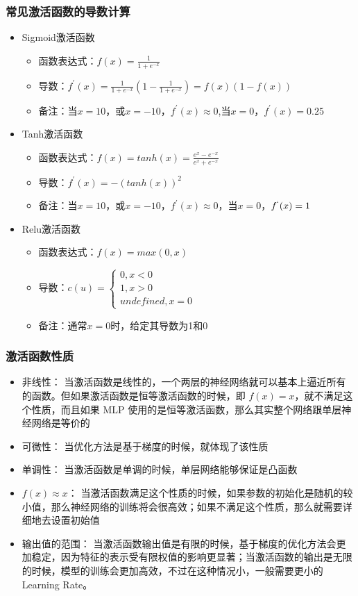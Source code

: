 \documentclass[UTF8]{ctexart}
\begin{document}
\subsubsection{常见激活函数的导数计算}
\begin{itemize}
	\item Sigmoid激活函数 \begin{itemize}
		\item 函数表达式：$f(x)=\frac{1}{1+e^{-x}}$
		\item 导数：$f^{'}(x)=\frac{1}{1+e^{-x}}\left( 1- \frac{1}{1+e^{-x}} \right)=f(x)(1-f(x))$
		\item 备注：当$x=10$，或$x=-10$，$f^{'}(x) \approx0$,当$x=0$，$f^{'}(x) =0.25$
	\end{itemize}
	\item Tanh激活函数 \begin{itemize}
		\item 函数表达式：$f(x)=tanh(x)=\frac{e^x-e^{-x}}{e^x+e^{-x}}$
		\item 导数：$f^{'}(x)=-(tanh(x))^2$
		\item 备注：当$x=10$，或$x=-10$，$f^{'}(x) \approx0$，当$x=0$，$f^{`}(x) =1$
	\end{itemize}
	\item Relu激活函数 \begin{itemize}
		\item 函数表达式：$f(x)=max(0,x)$
		\item 导数：$c(u)=\begin{cases} 0,x<0 \\ 1,x>0 \\ undefined,x=0\end{cases}$
		\item 备注：通常$x=0$时，给定其导数为1和0
	\end{itemize}
\end{itemize}
\subsubsection{激活函数性质}
\begin{itemize}
	\item 非线性： 当激活函数是线性的，一个两层的神经网络就可以基本上逼近所有的函数。但如果激活函数是恒等激活函数的时候，即 $ f(x)=x $，就不满足这个性质，而且如果 MLP 使用的是恒等激活函数，那么其实整个网络跟单层神经网络是等价的
	\item 可微性： 当优化方法是基于梯度的时候，就体现了该性质
	\item 单调性： 当激活函数是单调的时候，单层网络能够保证是凸函数
	\item $f(x) \approx x$： 当激活函数满足这个性质的时候，如果参数的初始化是随机的较小值，那么神经网络的训练将会很高效；如果不满足这个性质，那么就需要详细地去设置初始值
	\item 输出值的范围： 当激活函数输出值是有限的时候，基于梯度的优化方法会更加稳定，因为特征的表示受有限权值的影响更显著；当激活函数的输出是无限的时候，模型的训练会更加高效，不过在这种情况小，一般需要更小的 Learning Rate。
\end{itemize}
\end{document}
